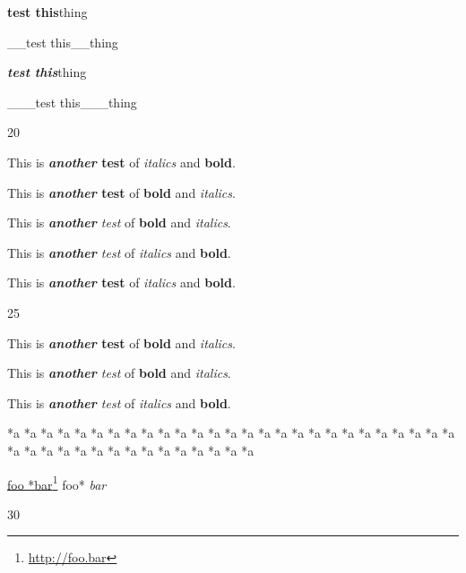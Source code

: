 \textbf{test this}thing

\_\_test this\_\_thing

\textbf{\emph{test this}}thing

\_\_\_test this\_\_\_thing

20

This is \textbf{\emph{another} test} of \emph{italics} and \textbf{bold}.

This is \textbf{\emph{another} test} of \textbf{bold} and \emph{italics}.

This is \emph{\textbf{another} test} of \textbf{bold} and \emph{italics}.

This is \emph{\textbf{another} test} of \emph{italics} and \textbf{bold}.

This is \textbf{\emph{another} test} of \emph{italics} and \textbf{bold}.

25

This is \textbf{\emph{another} test} of \textbf{bold} and \emph{italics}.

This is \emph{\textbf{another} test} of \textbf{bold} and \emph{italics}.

This is \emph{\textbf{another} test} of \emph{italics} and \textbf{bold}.

*a *a *a *a *a *a *a *a *a *a *a *a *a *a *a *a *a *a *a *a *a *a *a *a *a *a *a *a *a *a *a *a *a *a *a *a *a *a *a *a *a *a

\href{http://foo.bar}{foo *bar}\footnote{\href{http://foo.bar}{http:\slash{}\slash{}foo.bar}} foo* \emph{bar}

30



